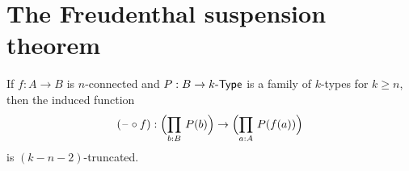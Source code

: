\documentclass[hott-all.tex]{subfiles}
\begin{document}
\section{The Freudenthal suspension theorem}
% 
% 
% 
\begin{lem}
  If $f:A\to B$ is $n$-connected and $P:B\to {k}\text-\mathsf{Type}$ is a family of $k$-types for $k\ge n$, then the induced function
  \[ (\blank\circ f) : \Parens{\prd{b:B} P(b)} \to \Parens{\prd{a:A} P(f(a)) } \]
  is $(k-n-2)$-truncated.
\end{lem}
\end{document}
